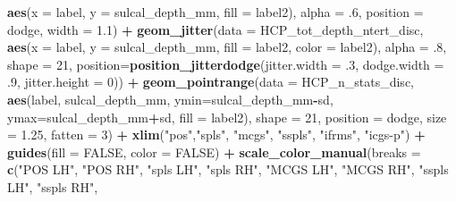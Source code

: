 \documentclass[
]{article}
\newenvironment{Shaded}{\begin{snugshade}}{\end{snugshade}}
\newcommand{\DataTypeTok}[1]{\textcolor[rgb]{0.13,0.29,0.53}{#1}}
\newcommand{\DecValTok}[1]{\textcolor[rgb]{0.00,0.00,0.81}{#1}}
\newcommand{\FloatTok}[1]{\textcolor[rgb]{0.00,0.00,0.81}{#1}}
\newcommand{\KeywordTok}[1]{\textcolor[rgb]{0.13,0.29,0.53}{\textbf{#1}}}
\newcommand{\NormalTok}[1]{#1}
\newcommand{\OperatorTok}[1]{\textcolor[rgb]{0.81,0.36,0.00}{\textbf{#1}}}
\newcommand{\OtherTok}[1]{\textcolor[rgb]{0.56,0.35,0.01}{#1}}
\newcommand{\StringTok}[1]{\textcolor[rgb]{0.31,0.60,0.02}{#1}}
\begin{document}
\begin{Shaded}
\begin{Highlighting}[]
              \KeywordTok{aes}\NormalTok{(}\DataTypeTok{x =}\NormalTok{ label, }\DataTypeTok{y =}\NormalTok{ sulcal_depth_mm, }\DataTypeTok{fill =}\NormalTok{ label2), }
              \DataTypeTok{alpha =} \FloatTok{.6}\NormalTok{, }\DataTypeTok{position =}\NormalTok{ dodge, }\DataTypeTok{width =} \FloatTok{1.1}\NormalTok{) }\OperatorTok{+}\StringTok{ }
\StringTok{  }\KeywordTok{geom_jitter}\NormalTok{(}\DataTypeTok{data =}\NormalTok{ HCP_tot_depth_ntert_disc, }
              \KeywordTok{aes}\NormalTok{(}\DataTypeTok{x =}\NormalTok{ label, }\DataTypeTok{y =}\NormalTok{ sulcal_depth_mm, }\DataTypeTok{fill =}\NormalTok{ label2, }\DataTypeTok{color =}\NormalTok{ label2), }
              \DataTypeTok{alpha =} \FloatTok{.8}\NormalTok{, }\DataTypeTok{shape =} \DecValTok{21}\NormalTok{,}
              \DataTypeTok{position=}\KeywordTok{position_jitterdodge}\NormalTok{(}\DataTypeTok{jitter.width =} \FloatTok{.3}\NormalTok{, }
                                            \DataTypeTok{dodge.width =} \FloatTok{.9}\NormalTok{, }
                                            \DataTypeTok{jitter.height =} \DecValTok{0}\NormalTok{)) }\OperatorTok{+}
\StringTok{  }\KeywordTok{geom_pointrange}\NormalTok{(}\DataTypeTok{data =}\NormalTok{ HCP_n_stats_disc, }
                  \KeywordTok{aes}\NormalTok{(label, sulcal_depth_mm, }\DataTypeTok{ymin=}\NormalTok{sulcal_depth_mm}\OperatorTok{-}\NormalTok{sd, }\DataTypeTok{ymax=}\NormalTok{sulcal_depth_mm}\OperatorTok{+}\NormalTok{sd, }\DataTypeTok{fill =}\NormalTok{ label2), }
                  \DataTypeTok{shape =} \DecValTok{21}\NormalTok{, }\DataTypeTok{position =}\NormalTok{ dodge, }\DataTypeTok{size =} \FloatTok{1.25}\NormalTok{, }\DataTypeTok{fatten =} \DecValTok{3}\NormalTok{) }\OperatorTok{+}
\StringTok{  }\KeywordTok{xlim}\NormalTok{(}\StringTok{"pos"}\NormalTok{,}\StringTok{"spls"}\NormalTok{, }\StringTok{"mcgs"}\NormalTok{, }\StringTok{"sspls"}\NormalTok{, }\StringTok{"ifrms"}\NormalTok{, }\StringTok{"icgs-p"}\NormalTok{) }\OperatorTok{+}
\StringTok{  }\KeywordTok{guides}\NormalTok{(}\DataTypeTok{fill =} \OtherTok{FALSE}\NormalTok{, }\DataTypeTok{color =} \OtherTok{FALSE}\NormalTok{) }\OperatorTok{+}
\StringTok{  }\KeywordTok{scale_color_manual}\NormalTok{(}\DataTypeTok{breaks =} 
                       \KeywordTok{c}\NormalTok{(}\StringTok{"POS LH"}\NormalTok{, }\StringTok{"POS RH"}\NormalTok{,}
                         \StringTok{"spls LH"}\NormalTok{, }\StringTok{"spls RH"}\NormalTok{,}
                         \StringTok{"MCGS LH"}\NormalTok{, }\StringTok{"MCGS RH"}\NormalTok{,}
                         \StringTok{"sspls LH"}\NormalTok{, }\StringTok{"sspls RH"}\NormalTok{,}

\end{Highlighting}
\end{Shaded}
\end{document}
